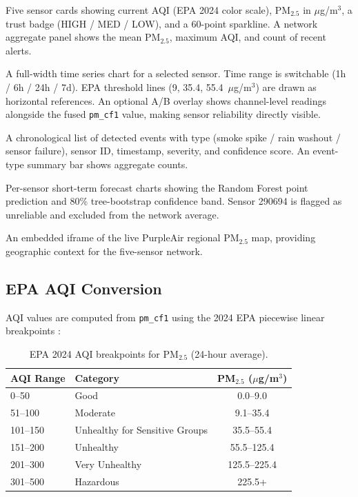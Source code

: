 \documentclass[11pt, letterpaper]{article}
\begin{document}
\begin{description}[style=nextline, leftmargin=2em]
  \item[\textbf{Overview}]
    Five sensor cards showing current AQI (EPA 2024 color scale), PM$_{2.5}$
    in $\mu$g/m$^3$, a trust badge (HIGH / MED / LOW), and a 60-point sparkline.
    A network aggregate panel shows the mean PM$_{2.5}$, maximum AQI, and
    count of recent alerts.

  \item[\textbf{Detail}]
    A full-width time series chart for a selected sensor.
    Time range is switchable (1h / 6h / 24h / 7d).
    EPA threshold lines (9, 35.4, 55.4~$\mu$g/m$^3$) are drawn as
    horizontal references.
    An optional A/B overlay shows channel-level readings alongside the
    fused \texttt{pm\_cf1} value, making sensor reliability directly visible.

  \item[\textbf{Events}]
    A chronological list of detected events with type (smoke spike /
    rain washout / sensor failure), sensor ID, timestamp, severity, and
    confidence score.
    An event-type summary bar shows aggregate counts.

  \item[\textbf{Forecast}]
    Per-sensor short-term forecast charts showing the Random Forest point
    prediction and 80\% tree-bootstrap confidence band.
    Sensor 290694 is flagged as unreliable and excluded from the network average.

  \item[\textbf{Map (Purple Air)}]
    An embedded iframe of the live PurpleAir regional PM$_{2.5}$ map,
    providing geographic context for the five-sensor network.
\end{description}

\subsection{EPA AQI Conversion}

AQI values are computed from \texttt{pm\_cf1} using the 2024 EPA piecewise
linear breakpoints \cite{epa2024}:

\begin{table}[h!]
\centering
\caption{EPA 2024 AQI breakpoints for PM$_{2.5}$ (24-hour average).}
\label{tab:aqi}
\begin{tabular}{llc}
\toprule
\textbf{AQI Range} & \textbf{Category} & \textbf{PM$_{2.5}$ ($\mu$g/m$^3$)} \\
\midrule
0--50   & Good                             & 0.0--9.0   \\
51--100 & Moderate                         & 9.1--35.4  \\
101--150 & Unhealthy for Sensitive Groups  & 35.5--55.4 \\
151--200 & Unhealthy                       & 55.5--125.4 \\
201--300 & Very Unhealthy                  & 125.5--225.4 \\
301--500 & Hazardous                       & 225.5+ \\
\bottomrule
\end{tabular}
\end{table}
\end{document}
